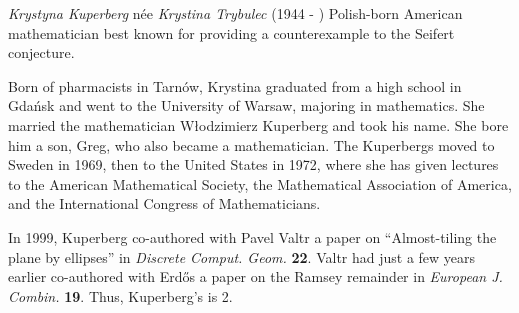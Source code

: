 \documentclass[12pt]{article}
\begin{document}
\emph{Krystyna Kuperberg} n\'ee \emph{Krystina Trybulec} (1944 - ) Polish-born American mathematician best known for providing a counterexample to the Seifert conjecture.

Born of pharmacists in Tarn\'ow, Krystina graduated from a high school in Gda\'nsk and went to the University of Warsaw, majoring in mathematics. She married the mathematician W\l{}odzimierz Kuperberg and took his name. She bore him a son, Greg, who also became a mathematician. The Kuperbergs moved to Sweden in 1969, then to the United States in 1972, where she has given lectures to the American Mathematical Society, the Mathematical Association of America, and the International Congress of Mathematicians.

In 1999, Kuperberg co-authored with Pavel Valtr a paper on ``Almost-tiling the plane by ellipses'' in {\it Discrete Comput. Geom.} {\bf 22}. Valtr had just a few years earlier co-authored with Erd\H{o}s a paper on the Ramsey remainder in {\it European J. Combin.} {\bf 19}.  Thus, Kuperberg's  is 2.
\end{document}
